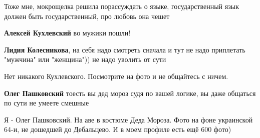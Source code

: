 Тоже мне, мокрощелка решила порассуждать о языке, государственный язык должен
быть государственный, про любовь она чешет

\begin{itemize}

\textbf{Алексей Кухлевский} во мужики пошли!


\textbf{Лидия Колесникова}, на себя надо смотреть сначала и тут не надо приплетать "мужчина" или "женщина")) не надо уволить от сути


Нет никакого Кухлевского. Посмотрите на фото и не общайтесь с ничем.


\textbf{Олег Пашковский} тоесть вы дед мороз судя по вашей логике, вы даже общаться по сути не умеете смешные


Я - Олег Пашковский. На аве в костюме Деда Мороза. Фото на фоне украинской 64-и, не дошедшей до Дебальцево. И в моем профиле есть ещё 600 фото)
\end{itemize}

